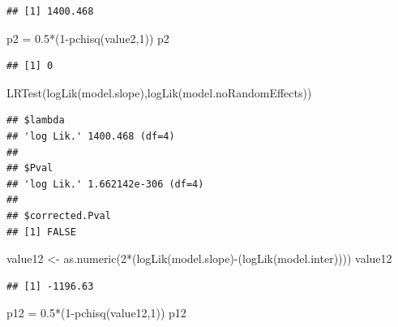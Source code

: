 \documentclass[
]{article}
\newenvironment{Shaded}{\begin{snugshade}}{\end{snugshade}}
\newcommand{\DecValTok}[1]{\textcolor[rgb]{0.00,0.00,0.81}{#1}}
\newcommand{\FloatTok}[1]{\textcolor[rgb]{0.00,0.00,0.81}{#1}}
\newcommand{\FunctionTok}[1]{\textcolor[rgb]{0.00,0.00,0.00}{#1}}
\newcommand{\NormalTok}[1]{#1}
\newcommand{\OtherTok}[1]{\textcolor[rgb]{0.56,0.35,0.01}{#1}}
\newcommand{\SpecialCharTok}[1]{\textcolor[rgb]{0.00,0.00,0.00}{#1}}
\begin{document}
\begin{verbatim}
## [1] 1400.468
\end{verbatim}

\begin{Shaded}
\begin{Highlighting}[]
\NormalTok{p2 }\OtherTok{=} \FloatTok{0.5}\SpecialCharTok{*}\NormalTok{(}\DecValTok{1}\SpecialCharTok{{-}}\FunctionTok{pchisq}\NormalTok{(value2,}\DecValTok{1}\NormalTok{))}
\NormalTok{p2}
\end{Highlighting}
\end{Shaded}

\begin{verbatim}
## [1] 0
\end{verbatim}

\begin{Shaded}
\begin{Highlighting}[]
\FunctionTok{LRTest}\NormalTok{(}\FunctionTok{logLik}\NormalTok{(model.slope),}\FunctionTok{logLik}\NormalTok{(model.noRandomEffects))}
\end{Highlighting}
\end{Shaded}

\begin{verbatim}
## $lambda
## 'log Lik.' 1400.468 (df=4)
## 
## $Pval
## 'log Lik.' 1.662142e-306 (df=4)
## 
## $corrected.Pval
## [1] FALSE
\end{verbatim}

\begin{Shaded}
\begin{Highlighting}[]
\NormalTok{value12 }\OtherTok{\textless{}{-}} \FunctionTok{as.numeric}\NormalTok{(}\DecValTok{2}\SpecialCharTok{*}\NormalTok{(}\FunctionTok{logLik}\NormalTok{(model.slope)}\SpecialCharTok{{-}}\NormalTok{(}\FunctionTok{logLik}\NormalTok{(model.inter))))}
\NormalTok{value12}
\end{Highlighting}
\end{Shaded}

\begin{verbatim}
## [1] -1196.63
\end{verbatim}

\begin{Shaded}
\begin{Highlighting}[]
\NormalTok{p12 }\OtherTok{=} \FloatTok{0.5}\SpecialCharTok{*}\NormalTok{(}\DecValTok{1}\SpecialCharTok{{-}}\FunctionTok{pchisq}\NormalTok{(value12,}\DecValTok{1}\NormalTok{))}
\NormalTok{p12}
\end{Highlighting}
\end{Shaded}
\end{document}
